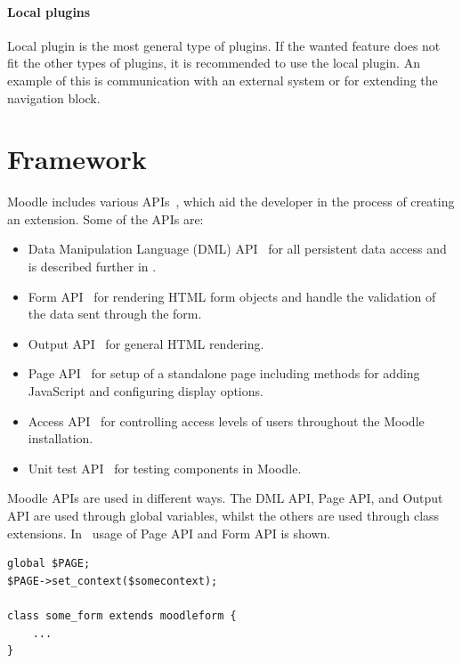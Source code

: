 \paragraph{Local plugins}
\label{par:localplugin}
Local plugin is the most general type of plugins. 
If the wanted feature does not fit the other types of plugins, it is recommended to use the local plugin. 
An example of this is communication with an external system or for extending the navigation block. 



\section{Framework}
Moodle includes various APIs~\cite{moodlecoreapis}, which aid the developer in the process of creating an extension. Some of the APIs are:

\begin{itemize}
	\item Data Manipulation Language (DML) API~\cite{moodledml} for all persistent data access and is described further in .
	\item Form API~\cite{moodleformapi} for rendering HTML form objects and handle the validation of the data sent through the form. 
	\item Output API~\cite{moodleoutputapi} for general HTML rendering.
	\item Page API~\cite{moodlepageapi} for setup of a standalone page including methods for adding JavaScript and configuring display options. 
	\item Access API~\cite{moodleaccessapi} for controlling access levels of users throughout the Moodle installation. 
	\item Unit test API~\cite{moodleunittestapi} for testing components in Moodle.
\end{itemize}
Moodle APIs are used in different ways. 
The DML API, Page API, and Output API are used through global variables, whilst the others are used through class extensions. 
In~ usage of Page API and Form API is shown.
\begin{lstlisting}[style=phpCode, caption=\myCaption{Example of the Page API and Form API in Moodle}, label=moodleapiusage]
global $PAGE;
$PAGE->set_context($somecontext);

class some_form extends moodleform {
	...
}
\end{lstlisting}

